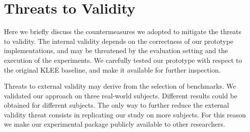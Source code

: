 \section{Threats to Validity}
Here we briefly discuss the countermeasures we adopted to mitigate the
threats to validity. The internal validity depends on the correctness
of our prototype implementations, and may be threatened by the
evaluation setting and the execution of the experiments.  We carefully
tested our prototype with respect to the original KLEE baseline, and
make it available for further inspection.

Threats to external validity may derive from the selection of
benchmarks. We validated our approach on three real-world
subjects. Different results could be obtained for different
subjects. The only way to further reduce the external validity threat
consists in replicating our study on more subjects. For this reason we
make our experimental package publicly available to other researchers.

